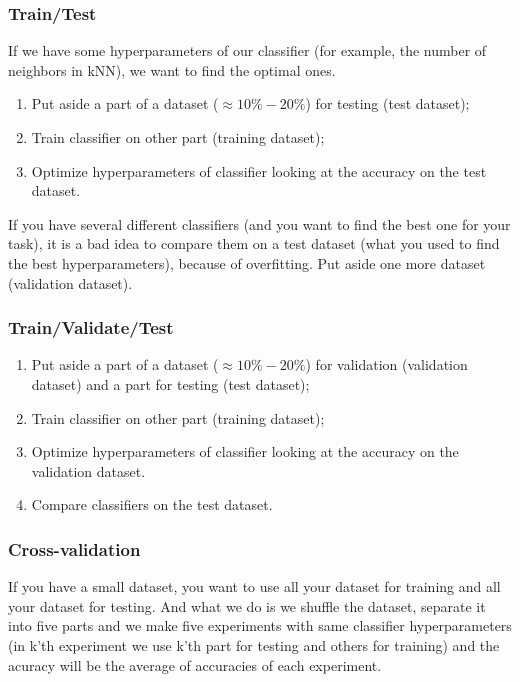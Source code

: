 \subsubsection*{Train/Test}

If we have some hyperparameters of our classifier (for example, the number of neighbors in kNN), we want to find the optimal ones.
\begin{enumerate}
	\item Put aside a part of a dataset ($\approx 10\%-20\%$) for testing (test dataset);
	\item Train classifier on other part (training dataset);
	\item Optimize hyperparameters of classifier looking at the accuracy on the test dataset.
\end{enumerate}
If you have several different classifiers (and you want to find the best one for your task), it is a bad idea to compare them on a test dataset (what you used to find the best hyperparameters), because of overfitting. Put aside one more dataset (validation dataset).

\subsubsection*{Train/Validate/Test}

\begin{enumerate}
	\item Put aside a part of a dataset ($\approx 10\%-20\%$) for validation (validation dataset) and a part for testing (test dataset);
	\item Train classifier on other part (training dataset);
	\item Optimize hyperparameters of classifier looking at the accuracy on the validation dataset.
	\item Compare classifiers on the test dataset.
\end{enumerate}

\subsubsection*{Cross-validation}

If you have a small dataset, you want to use all your dataset for training and all your dataset for testing. And what we do is we shuffle the dataset, separate it into five parts and we make five experiments with same classifier hyperparameters (in k'th experiment we use k'th part for testing and others for training) and the acuracy will be the average of accuracies of each experiment.

